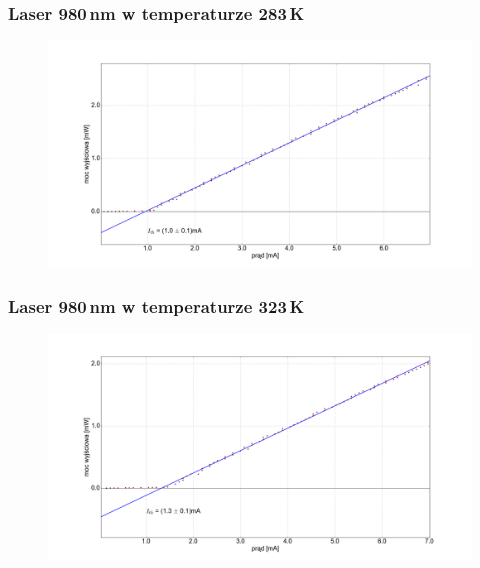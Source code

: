 \documentclass[xcolor={dvipsnames,table}]{beamer}
\begin{document}
\begin{frame}
\frametitle{Laser 980\,nm w temperaturze 283\,K}
\center
\begin{figure}
   \includegraphics[width=1.10\textwidth,natwidth=69,natheight=87]{temp_10_fit.png}
\end{figure}
\end{frame}

\begin{frame}
\frametitle{Laser 980\,nm w temperaturze 323\,K}
\center
\begin{figure}
   \includegraphics[width=1.10\textwidth,natwidth=69,natheight=87]{temp_50_fit.png}
\end{figure}
\end{frame}
\end{document}
